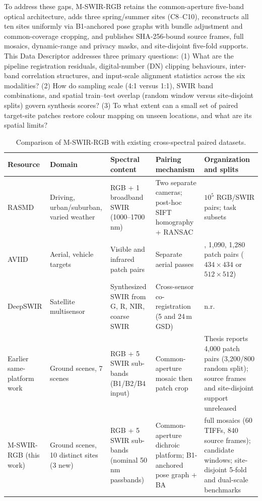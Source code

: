 \documentclass[a4paper,10pt]{article}
\begin{document}
To address these gaps, M-SWIR-RGB retains the common-aperture five-band optical architecture, adds three spring/summer sites (C8--C10), reconstructs all ten sites uniformly via B1-anchored pose graphs with bundle adjustment and common-coverage cropping, and publishes SHA-256-bound source frames, full mosaics, dynamic-range and privacy masks, and site-disjoint five-fold supports. This Data Descriptor addresses three primary questions: (1) What are the pipeline registration residuals, digital-number (DN) clipping behaviours, inter-band correlation structures, and input-scale alignment statistics across the six modalities? (2) How do sampling scale (4:1 versus 1:1), SWIR band combinations, and spatial train--test overlap (random window versus site-disjoint splits) govern synthesis scores? (3) To what extent can a small set of paired target-site patches restore colour mapping on unseen locations, and what are its spatial limits?

\begin{table}[htbp]
\centering
\caption{Comparison of M-SWIR-RGB with existing cross-spectral paired datasets.}
\label{tab:related-en}
\vspace{1pt}{\footnotesize\noindent Entries for external resources follow their published descriptions; ``n.r.'' indicates not reported.\par}
\small
\begin{tabularx}{\textwidth}{@{}>{\raggedright\arraybackslash}p{}>{\raggedright\arraybackslash}p{}>{\raggedright\arraybackslash}p{}>{\raggedright\arraybackslash}p{}>{\raggedright\arraybackslash}X@{}}
\toprule
Resource & Domain & Spectral content & Pairing mechanism & Organization and splits\\
\midrule
RASMD \cite{jin2026} & Driving, urban/suburban, varied weather & RGB + 1 broadband SWIR (1000--1700\,nm) & Two separate cameras; post-hoc SIFT homography + RANSAC & $10^5$ RGB/SWIR pairs; task subsets\\
AVIID \cite{aviid2023} & Aerial, vehicle targets & Visible and infrared patch pairs & Separate aerial passes & 993, 1,090, 1,280 patch pairs ($434\times434$ or $512\times512$)\\
DeepSWIR \cite{rout2019} & Satellite multisensor & Synthesized SWIR from G, R, NIR, coarse SWIR & Cross-sensor co-registration (5 and 24\,m GSD) & n.r.\\
Earlier same-platform work \cite{chen2026thesis,chen2026threeband} & Ground scenes, 7 scenes & RGB + 5 SWIR sub-bands (B1/B2/B4 input) & Common-aperture mosaic then patch crop & Thesis reports 4,000 patch pairs (3,200/800 random split); source frames and site-disjoint support unreleased\\
M-SWIR-RGB (this work) & Ground scenes, 10 distinct sites (3 new) & RGB + 5 SWIR sub-bands (nominal 50\,nm passbands) & Common-aperture dichroic platform; B1-anchored pose graph + BA & \DatasetSceneCount{} full mosaics (60 TIFFs, 840 source frames); \QualifiedWindowCount{} candidate windows; site-disjoint 5-fold and dual-scale benchmarks\\
\bottomrule
\end{tabularx}
\end{table}
\end{document}
